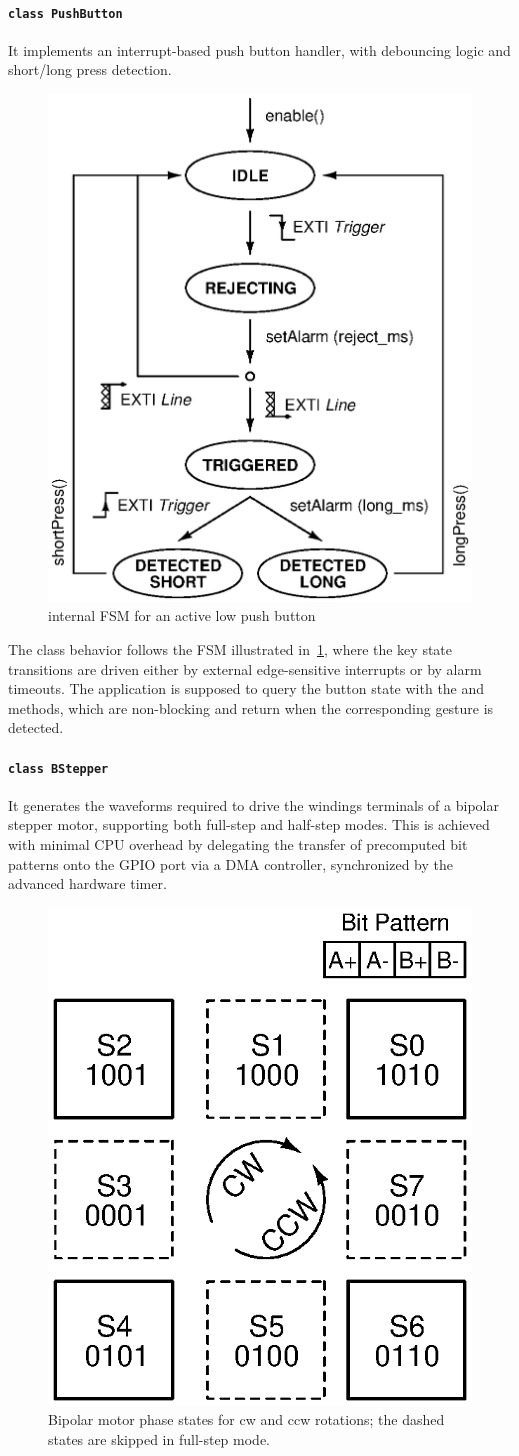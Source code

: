 \paragraph{\texttt{class PushButton}}
It implements an interrupt-based push button handler, with debouncing logic and short/long press detection.

\begin{figure}
    \centering
    \includegraphics[width=.45\linewidth]{../gfx/PushButton_fsm.eps}
    \caption{ internal FSM for an active low push button}
    \label{fig:pb_fsm}
\end{figure}

The class behavior follows the FSM illustrated in~\cref{fig:pb_fsm}, where the key state transitions are driven either by external edge-sensitive interrupts or by alarm timeouts. 
The application is supposed to query the button state with the  and  methods, which are non-blocking and return  when the corresponding gesture is detected.

\paragraph{\texttt{class BStepper}}
It generates the waveforms required to drive the windings terminals of a bipolar stepper motor, supporting both full-step and half-step modes. This is achieved with minimal CPU overhead by delegating the transfer of precomputed bit patterns onto the GPIO port via a DMA controller, synchronized by the advanced hardware timer.

\begin{figure}
    \centering
    \includegraphics[width=.35\linewidth]{../gfx/Translator_states.eps}
    \caption{Bipolar motor phase states for \acs{cw} and \acs{ccw} rotations; the dashed states are skipped in full-step mode.}
    \label{fig:bsteps}
\end{figure}

